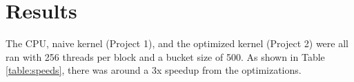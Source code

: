\section{Results}
\hspace{\parindent}The CPU, naive kernel (Project 1), and the optimized kernel (Project 2) were all ran with 256 threads per block and a bucket size of 500. As shown in Table \ref{table:speeds}, there was around a 3x speedup from the optimizations. 